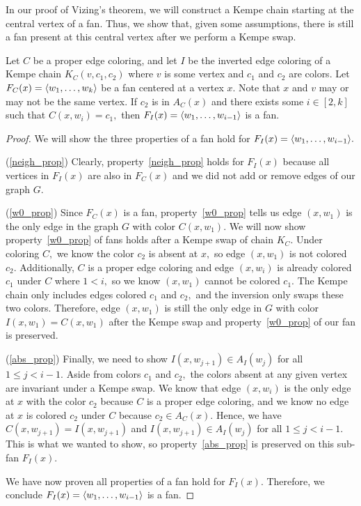 In our proof of Vizing's theorem, we will construct a Kempe chain starting at the central vertex of a fan. Thus, we show that, given some assumptions, there is still a fan present at this central vertex after we perform a Kempe swap.
\begin{prop}\label{inverted_fan}
    Let $C$ be a proper edge coloring, and let $I$ be the inverted edge coloring of a Kempe chain $K_C(v, c_1, c_2)$ where $v$ is some vertex and $c_1$ and $c_2$ are colors. Let $F_C(x) = \langle w_1, \dots, w_k\rangle$ be a fan centered at a vertex $x.$ Note that $x$ and $v$ may or may not be the same vertex. If $c_2$ is in $A_C(x)$ and there exists some $i \in [2, k]$ such that $C(x, w_i) = c_1,$  then $F_I(x) = \langle w_1, \dots, w_{i-1} \rangle$ is a fan.
\end{prop}
\begin{proof}
    We will show the three properties of a fan hold for $F_I(x) = \langle w_1, \dots, w_{i-1} \rangle.$

    (\ref{neigh_prop}) Clearly, property~\ref{neigh_prop} holds for $F_I(x)$ because all vertices in $F_I(x)$ are also in $F_C(x)$ and we did not add or remove edges of our graph $G.$
    
    (\ref{w0_prop}) Since $F_C(x)$ is a fan, property~\ref{w0_prop} tells us edge $(x, w_1)$ is the only edge in the graph $G$ with color $C(x, w_1).$ We will now show property~\ref{w0_prop} of fans holds after a Kempe swap of chain $K_C$. Under coloring $C,$ we know the color $c_2$ is absent at $x,$ so edge $(x, w_1)$ is not colored $c_2.$ Additionally, $C$ is a proper edge coloring and edge $(x, w_i)$ is already colored $c_1$ under $C$ where $1 < i,$ so we know $(x, w_1)$ cannot be colored $c_1.$ The Kempe chain only includes edges colored $c_1$ and $c_2,$ and the inversion only swaps these two colors. Therefore, edge $(x, w_1)$ is still the only edge in $G$ with color $I(x, w_1) = C(x, w_1)$ after the Kempe swap and property~\ref{w0_prop} of our fan is preserved.

    (\ref{abs_prop}) Finally, we need to show $I(x, w_{j+1}) \in A_I(w_j)$ for all $1 \leq j < i - 1.$ Aside from colors $c_1$ and $c_2,$ the colors absent at any given vertex are invariant under a Kempe swap. We know that edge $(x, w_i)$ is the only edge at $x$ with the color $c_2$ because $C$ is a proper edge coloring, and we know no edge at $x$ is colored $c_2$ under $C$ because $c_2 \in A_C(x).$ Hence, we have $C(x, w_{j+1}) = I(x, w_{j+1})$ and $I(x, w_{j+1}) \in A_I(w_j)$ for all $1 \leq j < i - 1.$ This is what we wanted to show, so property~\ref{abs_prop} is preserved on this sub-fan $F_I(x).$
    
    We have now proven all properties of a fan hold for $F_I(x).$ Therefore, we conclude $F_I(x) = \langle w_1, \dots, w_{i-1} \rangle$ is a fan.
\end{proof}

